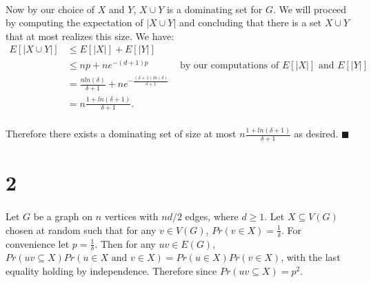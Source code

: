 \documentclass[letterpaper,12pt,oneside,onecolumn]{report}
\begin{document}
\paragraph{}
Now by our choice of $X$ and $Y$, $X \cup Y$ is a dominating set for $G$. We will proceed by computing the expectation of $|X \cup Y|$ and concluding that there is a set $X \cup Y$ that at most realizes this size. We have:
\begin{align*}
E[|X \cup Y|] &\leq E[|X|] + E[|Y|] \\
&\leq  np + ne^{-(d+1)p} &\text{ by our computations of $E[|X|]$ and $E[|Y|]$}\\
&= \frac{n ln(\delta)}{\delta + 1} + ne^{-\frac{(\delta + 1)ln(\delta)}{\delta+1}} \\
&= n\frac{1 + ln(\delta + 1)}{\delta + 1}.
\end{align*}
\paragraph{}
Therefore there exists a dominating set of size at most $n\frac{1 + ln(\delta + 1)}{\delta + 1}$ as desired. $\blacksquare$
\section*{2}
\paragraph{}
Let $G$ be a graph on $n$ vertices with $nd/2$ edges, where $d \geq 1$. Let $X \subseteq V(G)$ chosen at random such that for any $v \in V(G)$, $Pr(v \in X) = \frac{1}{\delta}$. For convenience let $p = \frac{1}{\delta}$. Then for any $uv \in E(G)$, $Pr(uv \subseteq X) Pr(u \in X \text{ and } v \in X) = Pr(u \in X)Pr(v \in X)$, with the last equality holding by independence. Therefore since $Pr(uv \subseteq X) = p^2$.
\end{document}
